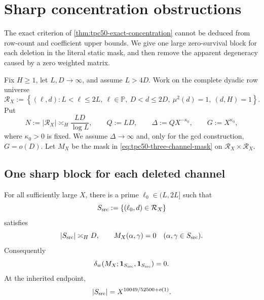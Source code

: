\section{Sharp concentration obstructions}
\label{sec:tpc50-obstructions}

The exact criterion of \cref{thm:tpc50-exact-concentration} cannot be
deduced from row-count and coefficient upper bounds.  We give one
large zero-survival block for each deletion in the literal static
mask, and then remove the apparent degeneracy caused by a zero weighted
matrix.

Fix \(H\ge1\), let \(L,D\to\infty\), and assume \(L>4D\).  Work on
the complete dyadic row universe
\begin{equation}
 \mathcal R_X
 :=
 \left\{(\ell,d):
 L<\ell\le2L,\ \ell\in\mathbb P,
 \ D<d\le2D,\ \mu^2(d)=1,\ (d,H)=1
 \right\}.
 \label{eq:tpc50-obstruction-universe}
\end{equation}
Put
\begin{equation}
 N:=|\mathcal R_X|
 \asymp_H\frac{LD}{\log L},
 \qquad
 Q:=LD,
 \qquad
 \Delta:=QX^{-\kappa_0},
 \qquad
 G:=X^{\kappa_0},
 \label{eq:tpc50-obstruction-scales}
\end{equation}
where \(\kappa_0>0\) is fixed.  We assume \(\Delta\to\infty\) and,
only for the gcd construction, \(G=o(D)\).  Let \(M_X\) be the mask
in \eqref{eq:tpc50-three-channel-mask} on
\(\mathcal R_X\times\mathcal R_X\).

\subsection{One sharp block for each deleted channel}

\begin{proposition}
\label{prop:tpc50-same-source-block}
For all sufficiently large \(X\), there is a prime
\(\ell_0\in(L,2L]\) such that
\begin{equation}
 S_{\rm src}
 :=\{(\ell_0,d)\in\mathcal R_X\}
 \label{eq:tpc50-source-block}
\end{equation}
satisfies
\begin{equation}
 |S_{\rm src}|\asymp_H D,
 \qquad
 M_X(\alpha,\gamma)=0
 \quad(\alpha,\gamma\in S_{\rm src}).
 \label{eq:tpc50-source-block-data}
\end{equation}
Consequently
\begin{equation}
 \delta_w(M_X;\mathbf 1_{S_{\rm src}},\mathbf 1_{S_{\rm src}})=0.
 \label{eq:tpc50-source-zero-survival}
\end{equation}
At the inherited endpoint,
\begin{equation}
 |S_{\rm src}|
 =X^{10049/52500+o(1)}.
 \label{eq:tpc50-source-block-endpoint}
\end{equation}
\end{proposition}

